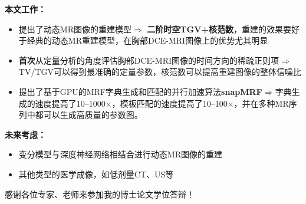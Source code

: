 \documentclass{beamer}
\begin{document}
\begin{frame}
\end{frame}

\begin{frame}
	\textbf{本文工作：}
	\begin{itemize}
		\item 提出了动态MR图像的重建模型$\Rightarrow$ \textbf{二阶时空TGV+核范数}，重建的效果要好于经典的动态MR重建模型，在胸部DCE-MRI图像上的优势尤其明显
		\item \textbf{首次}从定量分析的角度评估胸部DCE-MRI图像的时间方向的稀疏正则项$\Rightarrow$ TV/TGV可以得到最准确的定量参数，核范数可以提高重建图像的整体信噪比
		\item 提出了基于GPU的MRF字典生成和匹配的并行加速算法\textbf{snapMRF}$\Rightarrow$字典生成的速度提高了10--1000$\times$，模板匹配的速度提高了10--100$\times$，并在多种MR序列中都可以生成高质量的参数图。
	\end{itemize}
	
	\textbf{未来考虑：}
	\begin{itemize}
		\item 变分模型与深度神经网络相结合进行动态MR图像的重建
		\item 其他类型的医学成像，如低剂量CT、US等
	\end{itemize}
\end{frame}



\begin{frame}
\centerline{感谢各位专家、老师来参加我的博士论文学位答辩！}
\end{frame}

\end{document}
